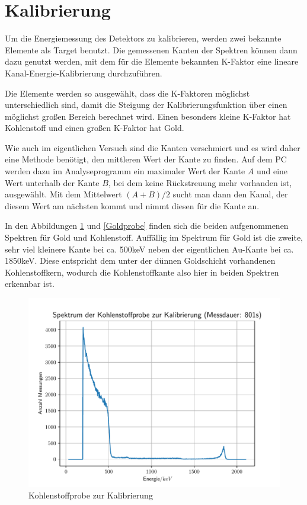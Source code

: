\section{Kalibrierung}
Um die Energiemessung des Detektors zu kalibrieren, werden zwei bekannte Elemente als Target benutzt. Die gemessenen Kanten der Spektren können dann dazu genutzt werden, mit dem für die Elemente bekannten K-Faktor eine lineare Kanal-Energie-Kalibrierung durchzuführen. 

Die Elemente werden so ausgewählt, dass die K-Faktoren möglichst unterschiedlich sind, damit die Steigung der Kalibrierungsfunktion über einen möglichst großen Bereich berechnet wird. Einen besonders kleine K-Faktor hat Kohlenstoff und einen großen K-Faktor hat Gold.

Wie auch im eigentlichen Versuch sind die Kanten verschmiert und es wird daher eine Methode benötigt, den mittleren Wert der Kante zu finden. Auf dem PC werden dazu im Analyseprogramm ein maximaler Wert der Kante $A$ und eine Wert unterhalb der Kante $B$, bei dem keine Rückstreuung mehr vorhanden ist, ausgewählt. Mit dem Mittelwert $(A+B)/2$ sucht man dann den Kanal, der diesem Wert am nächsten kommt und nimmt diesen für die Kante an.

In den Abbildungen \ref{Kohlenstoff} und \ref{Goldprobe} finden sich die beiden aufgenommenen Spektren für Gold und Kohlenstoff. Auffällig im Spektrum für Gold ist die zweite, sehr viel kleinere Kante bei ca. 500keV neben der eigentlichen Au-Kante bei ca. 1850keV. Diese entspricht dem unter der dünnen Goldschicht vorhandenen Kohlenstoffkern, wodurch die Kohlenstoffkante also hier in beiden Spektren erkennbar ist. 

\begin{figure}[htbp]  
     \includegraphics{Kohlenstoffprobe_zur_Kalibrierung.pdf}
  \caption{Kohlenstoffprobe zur Kalibrierung}
  \label{Kohlenstoff}
\end{figure}

